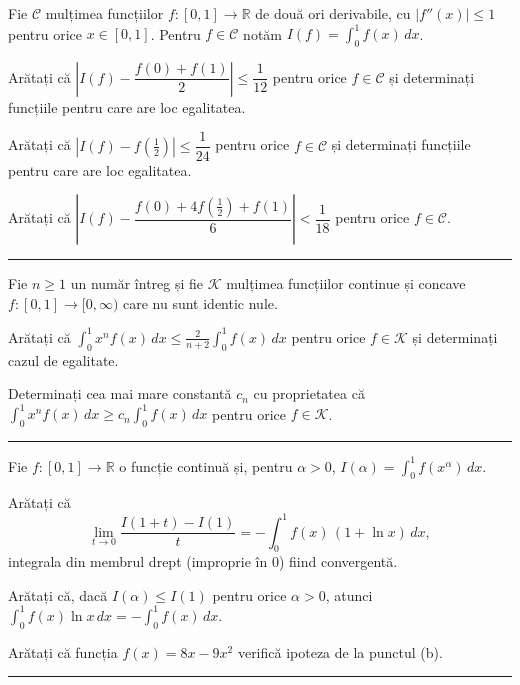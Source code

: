 Fie $\mathcal{C}$ mulțimea funcțiilor $f:[0,1]\to\mathbb{R}$ de două ori derivabile, cu
$|f''(x)|\le1$ pentru orice $x\in[0,1]$. Pentru $f\in\mathcal{C}$ notăm
$I(f)=\displaystyle\int_0^1 f(x)\,dx$.
\begin{parti}
  \item Arătați că $\left|I(f)-\dfrac{f(0)+f(1)}{2}\right|\le\dfrac1{12}$ pentru orice
        $f\in\mathcal{C}$ și determinați funcțiile pentru care are loc egalitatea.
  \item Arătați că $\left|I(f)-f\!\left(\tfrac12\right)\right|\le\dfrac1{24}$ pentru orice
        $f\in\mathcal{C}$ și determinați funcțiile pentru care are loc egalitatea.
  \item Arătați că
        $\left|I(f)-\dfrac{f(0)+4f\left(\frac12\right)+f(1)}{6}\right|<\dfrac1{18}$
        pentru orice $f\in\mathcal{C}$.
\end{parti}
\vspace{1mm}\hrule

Fie $n\ge1$ un număr întreg și fie $\mathcal{K}$ mulțimea funcțiilor continue și concave
$f:[0,1]\to[0,\infty)$ care nu sunt identic nule.
\begin{parti}
  \item Arătați că
        $\displaystyle\int_0^1 x^{n}f(x)\,dx\le\frac{2}{n+2}\int_0^1 f(x)\,dx$
        pentru orice $f\in\mathcal{K}$ și determinați cazul de egalitate.
  \item Determinați cea mai mare constantă $c_n$ cu proprietatea că
        $\displaystyle\int_0^1 x^{n}f(x)\,dx\ge c_n\int_0^1 f(x)\,dx$ pentru orice
        $f\in\mathcal{K}$.
\end{parti}
\vspace{1mm}\hrule

Fie $f:[0,1]\to\mathbb{R}$ o funcție continuă și, pentru $\alpha>0$,
$I(\alpha)=\displaystyle\int_0^1 f(x^{\alpha})\,dx$.
\begin{parti}
  \item Arătați că
        \[ \lim_{t\to0}\frac{I(1+t)-I(1)}{t}=-\int_0^1 f(x)\,(1+\ln x)\,dx , \]
        integrala din membrul drept (improprie în $0$) fiind convergentă.
  \item Arătați că, dacă $I(\alpha)\le I(1)$ pentru orice $\alpha>0$, atunci
        $\displaystyle\int_0^1 f(x)\ln x\,dx=-\int_0^1 f(x)\,dx$.
  \item Arătați că funcția $f(x)=8x-9x^{2}$ verifică ipoteza de la punctul (b).
\end{parti}
\vspace{1mm}\hrule

